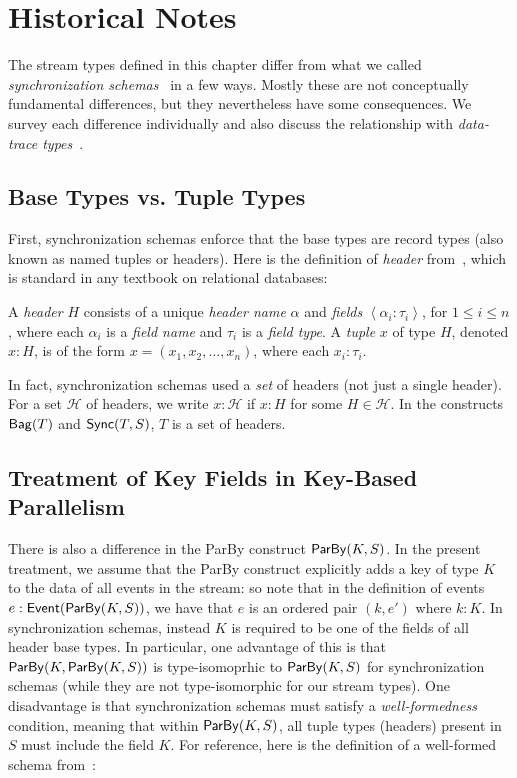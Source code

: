 \section{Historical Notes}
\label{sec:historical}

The stream types defined in this chapter differ from what we called \emph{synchronization schemas}~
in a few ways. Mostly these are not conceptually fundamental differences, but they nevertheless have some consequences. We survey each difference individually and also discuss the relationship with \emph{data-trace types}~.

\subsection{Base Types vs. Tuple Types}

First, synchronization schemas enforce that the base types are record types (also known as named tuples or headers).
Here is the definition of \emph{header} from~,
which is standard in any textbook on relational databases:
\begin{definition}
A \emph{header} $H$
consists of a unique \emph{header name} \(\alpha\)
and \emph{fields} \(\left\langle \alpha_i: \tau_i \right\rangle\), for $1\le i\le n$,
where each \(\alpha_i\) is a \emph{field name}
and \(\tau_i\) is a \emph{field type}.
A \emph{tuple} $x$ of type \(H\), denoted $x : H$, is of the form
\(x = (x_1, x_2, \ldots, x_n)\), where each \(x_i : \tau_i\).
\end{definition}

In fact, synchronization schemas used a \emph{set} of headers (not just a single header).
For a set $\mathcal{H}$ of headers, we write
$x: \mathcal{H}$ if $x : H$ for some $H \in \mathcal{H}$.
In the constructs $\mathsf{Bag}({T})$ and $\mathsf{Sync}({T}, S)$,
$T$ is a set of headers.

\subsection{Treatment of Key Fields in Key-Based Parallelism}

There is also a difference in the ParBy construct $\mathsf{ParBy}({K}, S)$.
In the present treatment, we assume that the ParBy construct explicitly adds a key of type $K$ to the data of all events in the stream: so note that in the definition of events $e: \mathsf{Event}({\mathsf{ParBy}({K}, S)})$, we have that $e$ is an ordered pair $(k, e')$
where $k: K$.
In synchronization schemas, instead $K$ is required to be one of the fields of all header base types.
In particular, one advantage of this is that $\mathsf{ParBy}({K}, \mathsf{ParBy}({K}, S))$ is type-isomoprhic to $\mathsf{ParBy}({K}, S)$ for synchronization schemas (while they are not type-isomorphic for our stream types).
One disadvantage is that synchronization schemas must satisfy a \emph{well-formedness} condition, meaning that within $\mathsf{ParBy}({K}, S)$, all tuple types (headers) present in $S$ must include the field $K$.
For reference, here is the definition of a well-formed schema from~:

